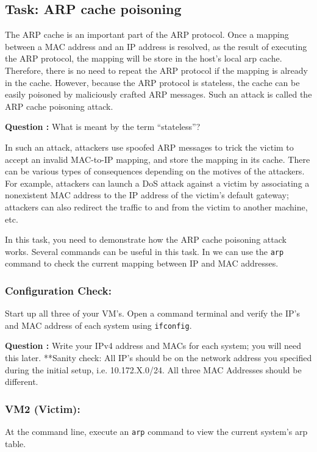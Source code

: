 \documentclass{article}
\begin{document}
\subsection{Task: ARP cache poisoning} 

The ARP cache is an important part of the ARP protocol. Once a mapping 
between a MAC address and an IP address is resolved, as the result of 
executing the ARP protocol, the mapping will be store in the host's local arp cache. Therefore,
there is no need to repeat the ARP protocol if the mapping is already in the 
cache. However, because the ARP protocol is stateless, the cache can
be easily poisoned by maliciously crafted ARP messages. Such an attack
is called the ARP cache poisoning attack.\medskip


\textbf{Question :} What is meant by the term ``stateless''?\medskip
\addtocounter{Question}{1}


In such an attack, attackers use spoofed ARP messages to trick the victim
to accept an invalid MAC-to-IP mapping, and store the mapping in its cache.
There can be various types of consequences depending on the motives of the 
attackers. For example, attackers can launch a DoS attack against a 
victim by associating a nonexistent MAC address to the IP address of 
the victim's default gateway; attackers can also redirect the traffic 
to and from the victim to another machine, etc.


In this task, you need to demonstrate how the ARP cache 
poisoning attack works.  Several commands can be useful in this task.
In \linux we can use the {\tt arp} command to check the current mapping between IP and MAC addresses.  

\subsubsection{Configuration Check:}
Start up all three of your VM's. Open a command terminal and verify the IP's and MAC address of each system using {\tt ifconfig}.\medskip

\textbf{Question :} 
Write your IPv4 address and MACs for each system; you will need this later. **Sanity check: All IP's should be on the network address you specified during the initial setup, i.e. 10.172.X.0/24. All three MAC Addresses should be different.
\addtocounter{Question}{1}

\subsubsection{VM2 (Victim):}
At the command line, execute an {\tt arp} command to view the current system's arp table. \medskip
\end{document}
